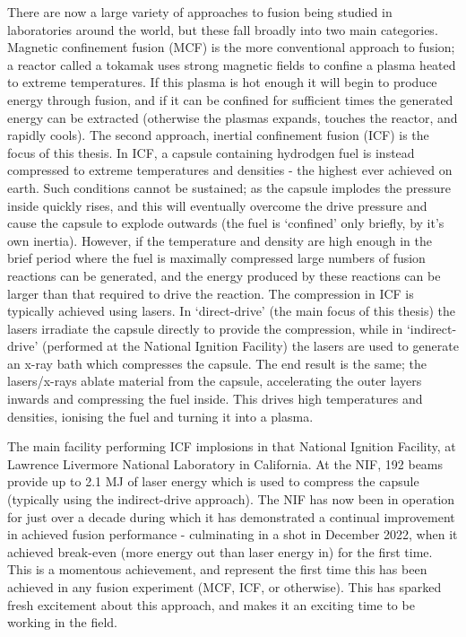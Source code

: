 There are now a large variety of approaches to fusion being studied in laboratories around the world, but these fall broadly into two main categories. Magnetic confinement fusion (MCF) is the more conventional approach to fusion; a reactor called a tokamak uses strong magnetic fields to confine a plasma heated to extreme temperatures. If this plasma is hot enough it will begin to produce energy through fusion, and if it can be confined for sufficient times the generated energy can be extracted (otherwise the plasmas expands, touches the reactor, and rapidly cools). The second approach, inertial confinement fusion (ICF) is the focus of this thesis. In ICF, a capsule containing hydrodgen fuel is instead compressed to extreme temperatures and densities - the highest ever achieved on earth. Such conditions cannot be sustained; as the capsule implodes the pressure inside quickly rises, and this will eventually overcome the drive pressure and cause the capsule to explode outwards (the fuel is `confined' only briefly, by it's own inertia). However, if the temperature and density are high enough in the brief period where the fuel is maximally compressed large numbers of fusion reactions can be generated, and the energy produced by these reactions can be larger than that required to drive the reaction. The compression in ICF is typically achieved using lasers. In `direct-drive' (the main focus of this thesis) the lasers irradiate the capsule directly to provide the compression, while in `indirect-drive' (performed at the National Ignition Facility) the lasers are used to generate an x-ray bath which compresses the capsule. The end result is the same; the lasers/x-rays ablate material from the capsule, accelerating the outer layers inwards and compressing the fuel inside. This drives high temperatures and densities, ionising the fuel and turning it into a plasma.

The main facility performing ICF implosions in that National Ignition Facility, at Lawrence Livermore National Laboratory in California. At the NIF, 192 beams provide up to 2.1 MJ of laser energy which is used to compress the capsule (typically using the indirect-drive approach). The NIF has now been in operation for just over a decade during which it has demonstrated a continual improvement in achieved fusion performance - culminating in a shot in December 2022, when it achieved break-even (more energy out than laser energy in) for the first time. This is a momentous achievement, and represent the first time this has been achieved in any fusion experiment (MCF, ICF, or otherwise). This has sparked fresh excitement about this approach, and makes it an exciting time to be working in the field.

